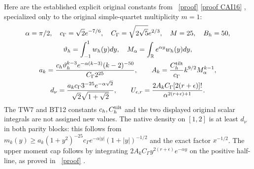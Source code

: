 \documentclass[11pt]{article}
\begin{document}
Here are the established explicit original constants from
\cite{NP,CAI}%
~\href{https://github.com/KokunoYumeto/zeta-function-research-reader/blob/5992ad50c0f2a06921f1fcaded7b4e38097c0739/workbenches/splitzero-tandem/continuations/20260920-original-kernel-mixed-determinants/providers/NATIVE_MOMENT_PRECISION.tex\#L1}{[proof]} \href{https://github.com/KokunoYumeto/zeta-function-research-reader/blob/487253b5b01851da5b9b98af4e146fecf1fab902/workbenches/splitzero-tandem/continuations/20260919-full-window-source-products/providers/CAI_COMPLETE_PREREQUISITE.tex\#L284}{[proof CAI16]}%
{}, specialized only to the original simple-quartet
multiplicity $m=1$:
\[
\begin{gathered}
 \alpha=\pi/2,\quad c_\Gamma=\sqrt2e^{-7/6},\quad
 C_\Gamma=\sqrt{2\sqrt5}e^{2/3},\quad M=25,\quad B_h=50,\\
 \vartheta_h=\int_{-1}^1w_h(y)dy,\quad
 M_\alpha=\int_{\mathbb R}e^{\alpha y}w_h(y)dy,\\
 a_k=\frac{c_h\vartheta_h^{k-3}e^{-\alpha(k-3)}(k-2)^{-50}}
                 {C_\Gamma2^{25}},\qquad
 A_k=\frac{C_h^{\rm tilt}}{c_\Gamma}k^{9/2}M_\alpha^{k-1},\\
 d_\nu=\frac{a_kc_\Gamma3^{-25}e^{-\alpha\sqrt2}}
                 {\sqrt2\sqrt{1+\sqrt2}},\qquad
 U_{\epsilon,r}=\frac{2A_kC_\Gamma[2(r+\epsilon)]!}
                         {\alpha^{2(r+\epsilon)+1}}.
\end{gathered}
\]
The TW7 and BT12 constants $c_h,C_h^{\rm tilt}$ and the two
displayed original scalar integrals are not assigned new values.
The native density on $[1,2]$ is at least $d_\nu$ in both parity
blocks: this follows from
$m_k(y)\ge a_k(1+y^2)^{-25}
c_\Gamma e^{-\alpha|y|}(1+|y|)^{-1/2}$ and the exact
factor $x^{-1/2}$. The upper moment cap follows by integrating
$2A_kC_\Gamma y^{2(r+\epsilon)}e^{-\alpha y}$ on the positive
half-line, as proved in \cite{NP}%
~\href{https://github.com/KokunoYumeto/zeta-function-research-reader/blob/5992ad50c0f2a06921f1fcaded7b4e38097c0739/workbenches/splitzero-tandem/continuations/20260920-original-kernel-mixed-determinants/providers/NATIVE_MOMENT_PRECISION.tex\#L1}{[proof]}%
{}.
\end{document}
